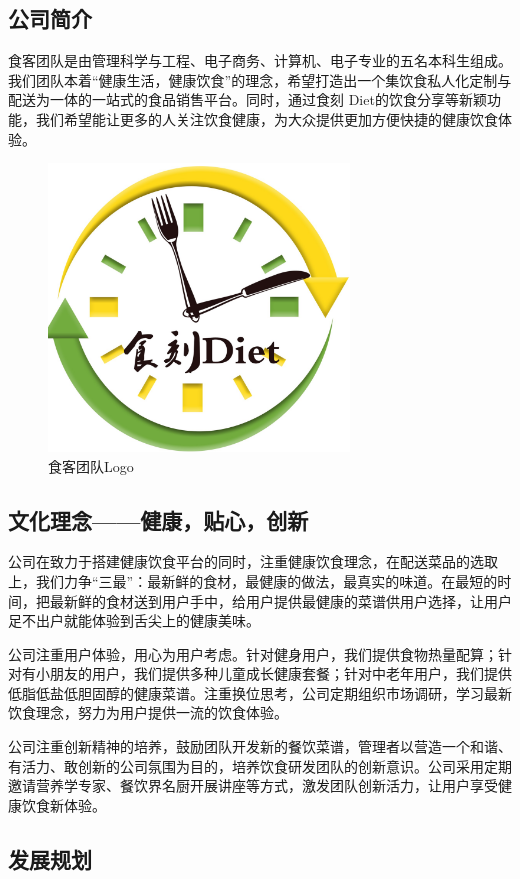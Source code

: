 \documentclass[UTF8,12pt]{ctexart}
\numberwithin{figure}{section}%
\begin{document}
\begin{spacing}{2}
\subsection{公司简介}
食客团队是由管理科学与工程、电子商务、计算机、电子专业的五名本科生组成。我们团队本着“健康生活，健康饮食”的理念，希望打造出一个集饮食私人化定制与配送为一体的一站式的食品销售平台。同时，通过食刻 Diet的饮食分享等新颖功能，我们希望能让更多的人关注饮食健康，为大众提供更加方便快捷的健康饮食体验。
\begin{figure}[!htb]
	\centering
	\includegraphics[width=8cm]{fig/logo}
	\caption{食客团队Logo}
\end{figure}
\subsection{文化理念——健康，贴心，创新}
公司在致力于搭建健康饮食平台的同时，注重健康饮食理念，在配送菜品的选取上，我们力争“三最”：最新鲜的食材，最健康的做法，最真实的味道。在最短的时间，把最新鲜的食材送到用户手中，给用户提供最健康的菜谱供用户选择，让用户足不出户就能体验到舌尖上的健康美味。

公司注重用户体验，用心为用户考虑。针对健身用户，我们提供食物热量配算；针对有小朋友的用户，我们提供多种儿童成长健康套餐；针对中老年用户，我们提供低脂低盐低胆固醇的健康菜谱。注重换位思考，公司定期组织市场调研，学习最新饮食理念，努力为用户提供一流的饮食体验。

公司注重创新精神的培养，鼓励团队开发新的餐饮菜谱，管理者以营造一个和谐、有活力、敢创新的公司氛围为目的，培养饮食研发团队的创新意识。公司采用定期邀请营养学专家、餐饮界名厨开展讲座等方式，激发团队创新活力，让用户享受健康饮食新体验。

\subsection{发展规划}

\end{spacing}
\end{document}
